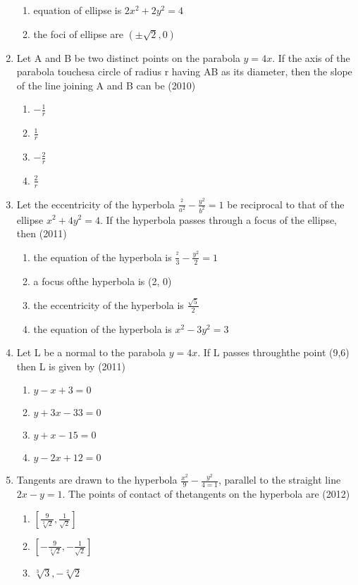 \documentclass[12pt]{article}
\providecommand{\sbrak}[1]{\ensuremath{{}\left[#1\right]}}
\begin{document}
\begin{enumerate}
\begin{enumerate}
\item equation of ellipse is $2x^2+2y^2=4$
\item the foci of ellipse are $(\pm\sqrt{2},0)$
\end{enumerate}
\item Let A and B be two distinct points on the parabola $y=4x$. If  the axis of the parabola touchesa circle of radius r having AB as its diameter, then the slope of the line joining A and B can be (2010)
\begin{enumerate}
\item $-\frac{1}{r}$
\item $\frac{1}{r}$
\item $-\frac{2}{r}$
\item $\frac{2}{r}$
\end{enumerate}
\item Let the eccentricity of the hyperbola $\frac{^2}{a^2}-\frac{y^2}{b^2}=1$ be reciprocal to that of the ellipse $x^2+ 4y^2=4$. If the hyperbola passes through a focus of the ellipse, then (2011)
\begin{enumerate}
\item the equation of the hyperbola is $\frac{^2}{3}-\frac{y^2}{2}=1$ 
\item a focus ofthe hyperbola is (2, 0)
\item the eccentricity of the hyperbola is $\frac{\sqrt{5}}{2}$
\item the equation of the hyperbola is $x^2-3y^2=3$
\end{enumerate}
\item Let L be a normal to the parabola $y=4x$. If L passes throughthe point (9,6) then L is given by (2011)
\begin{enumerate}
\item $y-x+3=0$
\item $y+3x-33=0$
\item $y+x-15=0$
\item $y-2x+12=0$ 
\end{enumerate}
\item Tangents are drawn to the hyperbola $\frac{x^2}{9}-\frac{y^2}{4=1}$, parallel to the straight line $2x-y=1$. The points of contact of thetangents on the hyperbola are (2012)
\begin{enumerate}
\item $\sbrak{\frac{9}{\sqrt[2]{2}},\frac{1}{\sqrt{2}}}$
\item $\sbrak{-\frac{9}{\sqrt[2]{2}},-\frac{1}{\sqrt{2}}}$
\item $\sqrt[3]{3},-\sqrt[2]{2}$

\end{enumerate}
\end{enumerate}
\end{document}
